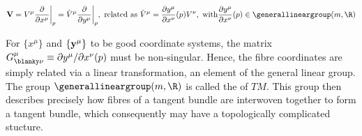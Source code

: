 \begin{equation*}
    {\bf V} = { V}^{\mu} \frac{\partial}{\partial x^{\mu}} \bigg|_{p} 
    = \tilde{{ V}}^{\mu} \frac{\partial}{\partial y^{\mu}} \bigg|_{p}, 
        \textnormal{ related as } 
    \tilde{{ V}}^{\mu} = \frac{\partial y^\mu}{\partial x^\nu}(p) {{V}}^{\nu}, 
        \textnormal{ with} 
    \frac{\partial y^\mu}{\partial x^\nu}(p) \in \generallineargroup(m, \R)
\end{equation*}

For $\{x^\mu\}$ and $\{\bf y^\mu\}$ to be good coordinate systems, the matrix $G^{\mu}_{\blanky \nu} \equiv {\partial y^\mu}/{\partial x^\nu}(p)$ must be non-singular. 
Hence, the fibre coordinates are simply related via a linear transformation, an element of the general linear group. The group $\generallineargroup(m, \R)$ is called the  of $TM$. 
This group then describes precisely how fibres of a tangent bundle are interwoven together to form a tangent bundle, which consequently may have a topologically complicated stucture. 
